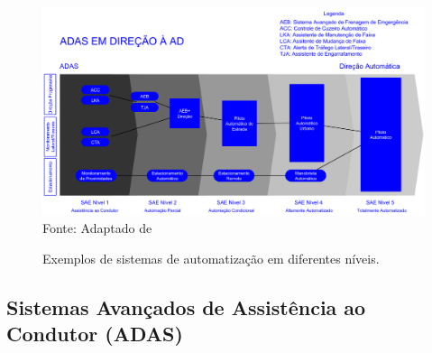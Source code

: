 \begin{figure}[!htb]
	\centering
	\caption{Exemplos de sistemas de automatização em diferentes níveis.} %
	\includegraphics[scale=0.27]{adas2ad.png}\\  %
	{\small Fonte: Adaptado de } %
	\label{fig:adas2ad} %
\end{figure}



\subsection{Sistemas Avançados de Assistência ao Condutor (ADAS)}

